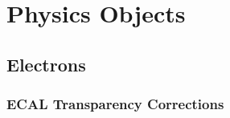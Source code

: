 \chapter{Physics Objects}

\section{Electrons}
\subsection{\ac{ECAL} Transparency Corrections}
\label{sec@reco_ecal_transparency}